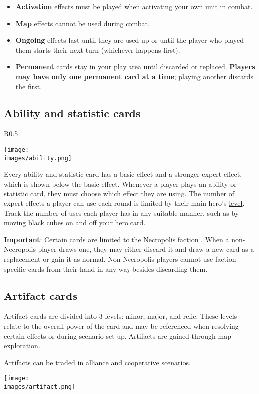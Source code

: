 \documentclass[12pt]{article}
\def\assets{assets}
\def\images{\assets/images}
\def\svgs{\assets/svgs}
\begin{document}
\begin{enumerate}
\begin{itemize}
        \item \textbf{Activation}  effects must be played when activating your own unit in combat.
        \item \textbf{Map}  effects cannot be used during combat.
        \item \textbf{Ongoing}  effects last until they are used up or until the player who played them starts their next turn (whichever happens first).
        \item \textbf{Permanent}  cards stay in your play area until discarded or replaced. \textbf{Players may have only one permanent card at a time}; playing another discards the first.
    \end{itemize}

\end{enumerate}

\clearpage
\subsection*{\hypertarget{Ability}{Ability and statistic cards}}
\begin{wrapfigure}{R}{0.5\textwidth}

    \texttt{[image: \\images/ability.png]}

\end{wrapfigure}

Every ability and statistic card has a basic effect and a stronger expert effect, which is shown below the basic effect. Whenever a player plays an ability or statistic card, they must choose which effect they are using. The number of expert  effects a player can use each round is limited by their main hero’s \hyperlink{Level}{level}. Track the number of uses each player has in any suitable manner, such as by moving black cubes on and off your hero card.\par
\textbf{Important}: Certain cards are limited to the Necropolis faction . When a non-Necropolis player draws one, they may either discard it and draw a new card as a replacement or gain it as normal. Non-Necropolis players cannot use faction specific cards from their hand in any way besides discarding them.

\subsection*{Artifact cards}
Artifact cards are divided into 3 levels: minor, major, and relic. These levels relate to the overall power of the card and may be referenced when resolving certain effects or during scenario set up. Artifacts are gained through map exploration.\par
Artifacts can be \hyperlink{Trading}{traded} in alliance and cooperative scenarios.\par
\texttt{[image: \\images/artifact.png]}
\end{document}
